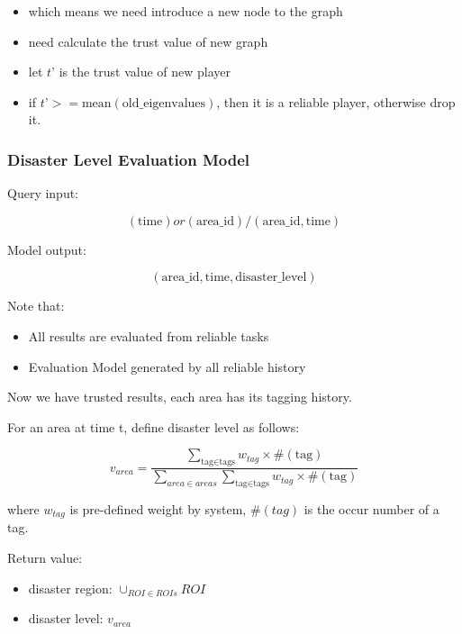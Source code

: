     \begin{itemize}
      \item which means we need introduce a new node to the graph
      \item need calculate the trust value of new graph
      \item let $t’$ is the trust value of new player
      \item if $t’ >= \text{mean}(\text{old\_eigenvalues})$, then it is a reliable player, otherwise drop it.
    \end{itemize}

    \subsubsection{Disaster Level Evaluation Model}

    Query input:

    \[
    (\text{time}) or (\text{area\_id})/(\text{area\_id}, \text{time})
    \]

    Model output:

    \[
    (\text{area\_id}, \text{time}, \text{disaster\_level})
    \]

    Note that:

    \begin{itemize}
      \item All results are evaluated from reliable tasks
      \item Evaluation Model generated by all reliable history
    \end{itemize}

    Now we have trusted results, each area has its tagging history.

    For an area at time t, define disaster level as follows:

    \[
    v_{area} = \frac{
    \sum_{\text{tag}\in\text{tags}}
      {w_{tag}\times\#(\text{tag})}
    }
    {\sum_{area\in areas}{\sum_{\text{tag}\in\text{tags}}{w_{tag}\times\#(\text{tag})}}}
    \]

    where $w_{tag}$ is pre-defined weight by system, $\#(tag)$ is the occur number of a tag.

    Return value:

    \begin{itemize}
      \item disaster region: $\cup_{ROI\in ROIs}{ROI}$
      \item disaster level: $v_{area}$
    \end{itemize}

